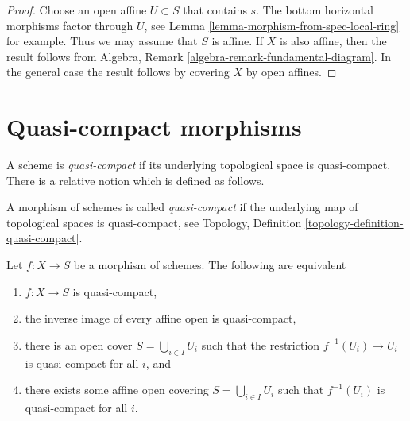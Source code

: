 \begin{proof}
Choose an open affine $U \subset S$ that contains $s$.
The bottom horizontal morphisms factor through $U$, see
Lemma \ref{lemma-morphism-from-spec-local-ring} for example.
Thus we may assume that $S$ is affine. If $X$ is also affine, then
the result follows from
Algebra, Remark \ref{algebra-remark-fundamental-diagram}.
In the general case the result follows by covering $X$ by open affines.
\end{proof}







\section{Quasi-compact morphisms}
\label{section-quasi-compact}

\noindent
A scheme is {\it quasi-compact} if its underlying topological space is
quasi-compact. There is a relative notion which is defined as follows.

\begin{definition}
\label{definition-quasi-compact}
A morphism of schemes is called {\it quasi-compact}
if the underlying map of topological spaces is
quasi-compact, see
Topology, Definition \ref{topology-definition-quasi-compact}.
\end{definition}

\begin{lemma}
\label{lemma-quasi-compact-affine}
Let $f : X \to S$ be a morphism of schemes.
The following are equivalent
\begin{enumerate}
\item $f : X \to S$ is quasi-compact,
\item the inverse image of every affine open is quasi-compact,
\item there is an open cover $S=\bigcup_{i\in I} U_i$
such that the restriction $f^{-1}(U_i)\to U_i$
is quasi-compact for all $i$, and
\item there exists some affine open covering $S = \bigcup_{i \in I} U_i$
such that $f^{-1}(U_i)$ is quasi-compact for all $i$.
\end{enumerate}
\end{lemma}


